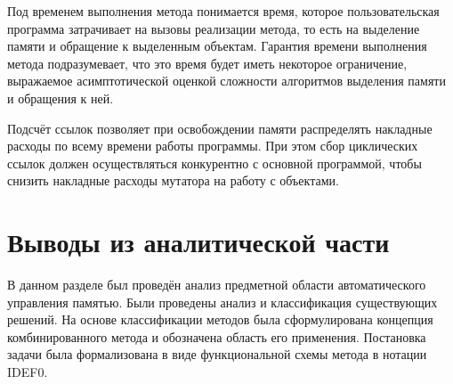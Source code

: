 Под временем выполнения метода понимается время, которое пользовательская программа затрачивает на вызовы реализации метода, то есть на выделение памяти и обращение к выделенным объектам. Гарантия времени выполнения метода подразумевает, что это время будет иметь некоторое ограничение, выражаемое асимптотической оценкой сложности алгоритмов выделения памяти и обращения к ней.

Подсчёт ссылок позволяет при освобождении памяти распределять накладные расходы по всему времени работы программы. При этом сбор циклических ссылок должен осуществляться конкурентно с основной программой, чтобы снизить накладные расходы мутатора на работу с объектами.



\section*{Выводы из аналитической части}

В данном разделе был проведён анализ предметной области автоматического управления памятью. Были проведены анализ и классификация существующих решений. На основе классификации методов была сформулирована концепция комбинированного метода и обозначена область его применения. Постановка задачи была формализована в виде функциональной схемы метода в нотации IDEF0.
